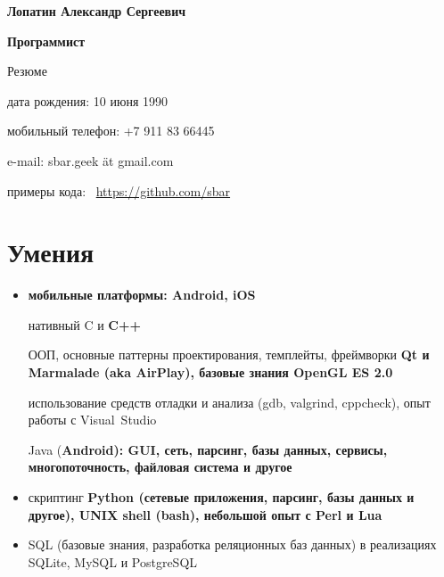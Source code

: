 \begin{center}
\fontsize{16pt}{14pt}\selectfont
\bfseries Лопатин Александр Сергеевич\mdseries

\fontsize{14pt}{14pt}\selectfont
\bfseries Программист\mdseries

Резюме
\end{center}
{
\fontsize{12pt}{12pt}\selectfont
\begin{flushright}
\item дата рождения: 10 июня 1990
\item мобильный телефон: +7 911 83 66445
\item e-mail: sbar.geek ät gmail.com
\item примеры кода: \
\href{https://github.com/sbar?tab=repositories}{https://github.com/sbar}
\end{flushright}
}

\setcounter{section}{0}
\section{Умения}
\begin{itemize}

\item \bfseries мобильные платформы: \mdseries Android, iOS

\subitem нативный C и \bfseries C++\mdseries

\subsubitem ООП, основные паттерны проектирования, темплейты,
фреймворки
\bfseries Qt \mdseries и
\bfseries Marmalade \mdseries
(aka \bfseries AirPlay\mdseries),
базовые знания OpenGL ES 2.0

\subsubitem использование средств отладки и анализа (gdb, valgrind, cppcheck),
опыт работы с Visual~Studio

\subitem Java (\bfseries Android\mdseries): GUI, сеть, парсинг, базы данных, сервисы, многопоточность, файловая система и другое

\item скриптинг
\subitem \bfseries Python\mdseries
(сетевые приложения, парсинг, базы данных и другое),
\bfseries UNIX shell (bash)\mdseries,
небольшой опыт с \bfseries Perl \mdseries и \bfseries Lua\mdseries

\item SQL (базовые знания, разработка реляционных баз данных)
в реализациях SQLite, MySQL и PostgreSQL
\end{itemize}

